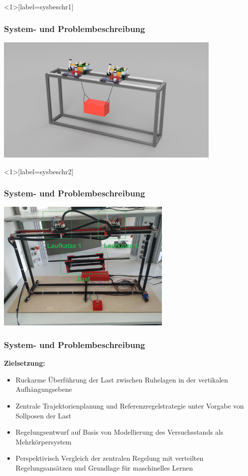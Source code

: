 \documentclass[
	ngerman,
	10pt,				%
	aspectratio=169 	%
]{beamer}
\begin{document}

\begin{frame}<1>[label=sysbeschr1]
	\frametitle{System- { und Problembeschreibung}}
	\begin{center}
		\includegraphics[width=110mm]{images/Veritas_demo_CAD}
	\end{center}

\end{frame}


\begin{frame}<1>[label=sysbeschr2]
	\frametitle{System- { und Problembeschreibung}}
	\begin{center}
		\includegraphics[width=85mm]{images/real_gantry}
	\end{center}
	
\end{frame}


\begin{frame}[label=sysbeschr3]
	\frametitle{System- und Problembeschreibung}
	\textbf{Zielsetzung:}
	\begin{itemize}
		\item Ruckarme Überführung der Last zwischen Ruhelagen in der vertikalen Aufhängungsebene
		\pause
		\item Zentrale Trajektorienplanung und Referenzregelstrategie unter Vorgabe von Sollposen der Last
		\pause
		\item Regelungsentwurf auf Basis von Modellierung des Versuchsstands als Mehrkörpersystem
		\pause  
		\item Perspektivisch Vergleich der zentralen Regelung mit verteilten Regelungsansätzen und Grundlage für maschinelles Lernen 
	\end{itemize}
\end{frame}
\end{document}
